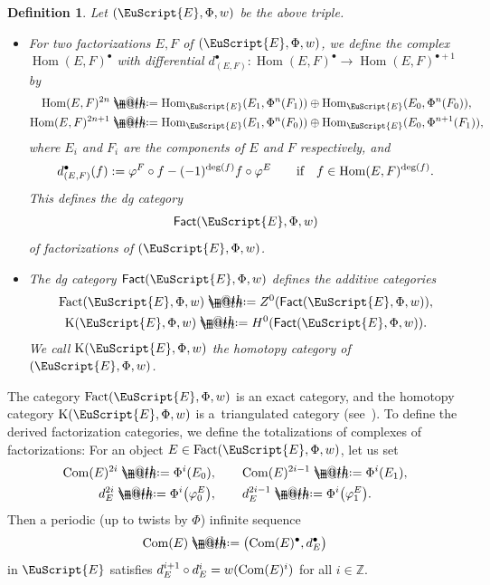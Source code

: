 \documentclass[10pt,a4paper]{amsart}
\makeatletter
\newtheorem{dfn}{Definition}[section]
\newcommand*{\defeq}{\mathrel{\rlap{%
 \raisebox{0.3ex}{$\m@th\cdot$}}%
 \raisebox{-0.3ex}{$\m@th\cdot$}}%
 =}
\numberwithin{equation}{section}
\newcommand{\Fact}{\operatorname{Fact}}
\newcommand{\dgFact}{\operatorname{\sf{Fact}}}
\newcommand{\Hom}{\operatorname{Hom}}
\newcommand{\K}{\operatorname{K}}
\newcommand{\bZ}{\mathbb{Z}}
\newcommand{\scrE}{\EuScript{E}}
\makeatother
\begin{document}
\begin{dfn}
Let $(\scrE,\Phi,w)$ be the above triple.
\begin{itemize}\itemsep=0pt
\item[$1.$] For two factorizations $E,F$ of $(\scrE,\Phi,w)$, we define the complex $\Hom(E,F)^{\bullet}$ with differential $d^{\bullet}_{(E,F)}\colon\Hom(E,F)^{\bullet}\to\Hom(E,F)^{\bullet+1}$ by
\begin{gather*}
{\rm Hom}(E,F)^{2n}\defeq{\rm Hom}_{\scrE}(E_1,\Phi^n(F_1))\oplus{\rm Hom}_{\scrE}(E_0,\Phi^n(F_0)),
\\
{\rm Hom}(E,F)^{2n+1}\defeq{\rm Hom}_{\scrE}(E_1,\Phi^{n}(F_0))\oplus{\rm Hom}_{\scrE}(E_0,\Phi^{n+1}(F_1)),
\end{gather*}
where $E_i$ and $F_i$ are the components of $E$ and $F$ respectively, and
\begin{gather*}
d^{\bullet}_{(E,F)}(f):=\varphi^F\circ f-(-1)^{{\rm deg}(f)}f\circ \varphi^E
\qquad\text{if}\quad f\in{\rm Hom}(E,F)^{{\rm deg}(f)}.
\end{gather*}
This defines the dg category
\begin{gather*}
\dgFact(\scrE,\Phi,w)
\end{gather*}
of factorizations of $(\scrE,\Phi,w)$.

\item[$2.$] The dg category $\dgFact(\scrE,\Phi,w)$ defines the additive categories
\begin{gather*}
\Fact(\scrE,\Phi,w)\defeq Z^0(\dgFact(\scrE,\Phi,w)),
\\
\K(\scrE,\Phi,w)\defeq H^0(\dgFact(\scrE,\Phi,w)).
\end{gather*}
We call $\K(\scrE,\Phi,w)$ the {\it homotopy category} of $(\scrE,\Phi,w)$.
\end{itemize}
\end{dfn}

The category $\Fact(\scrE,\Phi,w)$ is an exact category, and the homotopy category $\K(\scrE,\Phi,w)$ is a~triangulated category (see~\cite[Propositions~3.5 and~3.9]{H1}). To define the derived factorization categories, we define the totalizations of complexes of factorizations: For an object $E\in \Fact(\scrE,\Phi,w)$, let us set
\begin{gather*}
{\rm Com}(E)^{2i}\defeq\Phi^i(E_0), \qquad {\rm Com}(E)^{2i-1}\defeq\Phi^i(E_1),
\\
d_E^{2i}\defeq\Phi^i\big(\varphi_0^E\big),\qquad d_E^{2i-1}\defeq\Phi^i\big(\varphi_1^E\big).
\end{gather*}
Then a periodic (up to twists by $\Phi$) infinite sequence
\begin{gather*}
{\rm Com}(E)\defeq\big({\rm Com}(E)^{\bullet}, d_E^{\bullet}\big)
\end{gather*}
 in $\scrE$ satisfies $d_E^{i+1}\circ d_E^i=w({\rm Com}(E)^i)$ for all $i\in\bZ$.
\end{document}

